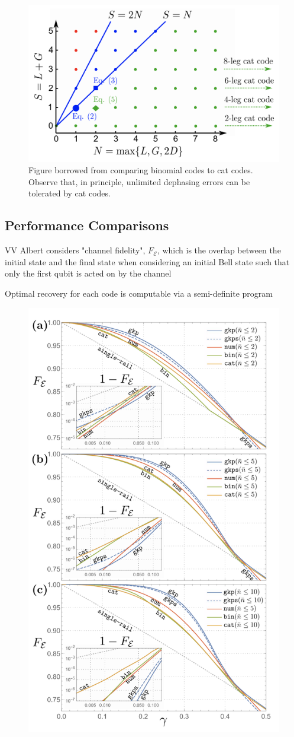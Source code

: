 \documentclass[12]{amsart}
\newcommand\0{\mathbf{0}}
\newcommand\<{\langle}
\renewcommand\>{\rangle}
\begin{document}
\begin{figure}
\centering
\includegraphics[width=0.5\linewidth,keepaspectratio]{binom_cat.png}	
\caption{Figure borrowed from \cite{michael2016new} comparing binomial codes to cat codes. Observe that, in principle, unlimited dephasing errors can be tolerated by cat codes.}
\end{figure}

\subsection{Performance Comparisons}

VV Albert considers "channel fidelity", $F_\mathcal{E}$, which is the overlap between the initial state and the final state when considering an initial Bell state such that only the first qubit is acted on by the channel

Optimal recovery for each code is computable via a semi-definite program

\begin{figure}[H]
\centering
\includegraphics[width=0.5\linewidth,keepaspectratio]{fidelity.png}	
\end{figure}
\end{document}
